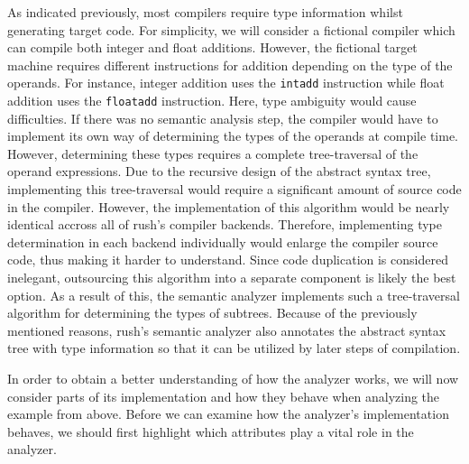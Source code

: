 As indicated previously, most compilers require type information whilst
generating target code. For simplicity, we will consider a fictional compiler
which can compile both integer and float additions. However, the fictional
target machine requires different instructions for addition depending on the
type of the operands. For instance, integer addition uses the \texttt{intadd} instruction
while float addition uses the \texttt{floatadd} instruction. Here, type ambiguity would
cause difficulties. If there was no semantic analysis step, the compiler would
have to implement its own way of determining the types of the operands at
compile time. However, determining these types requires a complete
tree-traversal of the operand expressions. Due to the recursive design of the
abstract syntax tree, implementing this tree-traversal would require a
significant amount of source code in the compiler. However, the implementation
of this algorithm would be nearly identical accross all of rush's compiler
backends. Therefore, implementing type determination in each backend
individually would enlarge the compiler source code, thus making it harder to
understand. Since code duplication is considered inelegant, outsourcing this
algorithm into a separate component is likely the best option. As a result of
this, the semantic analyzer implements such a tree-traversal algorithm for
determining the types of subtrees. Because of the previously mentioned reasons,
rush's semantic analyzer also annotates the abstract syntax tree with type
information so that it can be utilized by later steps of compilation.

In order to obtain a better understanding of how the analyzer works, we will now
consider parts of its implementation and how they behave when analyzing the
example from above. Before we can examine how the analyzer's implementation behaves,
we should first highlight which attributes play a vital role in the analyzer.


